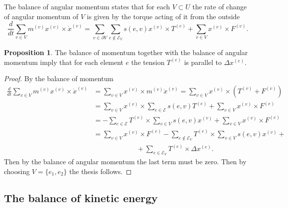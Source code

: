 \documentclass[a4paper,11pt]{article}
\theoremstyle{definition}
\newtheorem{proposition}{Proposition}
\begin{document}
The balance of angular momentum states that for each $V\subset U$ the rate of change of angular momentum of $V$ is given by the torque acting of it from the outside
\[
\frac{d}{dt}\sum_{v\in V}m^{(v)}x^{(v)}\times\dot{x}^{(v)}=\sum_{v\in\partial V}\sum_{e\notin\mathscr{E}_V}s(e,v)x^{(v)}\times T^{(e)}+\sum_{v\in V}x^{(v)}\times F^{(v)}.
\]
\begin{proposition}
The balance of momentum together with the balance of angular momentum imply that for each element $e$ the tension $T^{(e)}$ is parallel to $\Delta x^{(e)}$.
\end{proposition}
\begin{proof}
By the balance of momentum
\[
\begin{split}
\frac{d}{dt}\sum_{v\in V}m^{(v)}x^{(v)}\times\dot{x}^{(v)}&=\sum_{v\in V}x^{(v)}\times m^{(v)}\ddot{x}^{(v)}=\sum_{v\in V}x^{(v)}\times\left(T^{(v)}+F^{(v)}\right) \\
&=\sum_{v\in V}x^{(v)}\times\sum_{e\in\mathscr{E}}s(e,v)T^{(e)}+\sum_{v\in V}x^{(v)}\times F^{(e)} \\
&=-\sum_{e\in\mathscr{E}}T^{(e)}\times\sum_{v\in V}s(e,v)x^{(v)}+\sum_{v\in V}x^{(v)}\times F^{(e)} \\
&=\sum_{v\in V}x^{(v)}\times F^{(e)}-\sum_{e\notin\mathscr{E}_V}T^{(e)}\times\sum_{v\in V}s(e,v)x^{(v)}+\\
&\hspace{75pt}+\sum_{e\in\mathscr{E}_V}T^{(e)}\times\Delta x^{(e)}.
\end{split}
\]
Then by the balance of angular momentum the last term must be zero. Then by choosing $V=\{e_1,e_2\}$ the thesis follows.
\end{proof}

\subsection*{The balance of kinetic energy}
\end{document}
